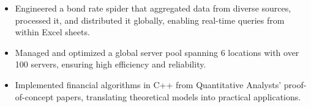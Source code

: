 \begin{minipage}{\linewidth}
\begin{itemize}
  \item Engineered a bond rate spider that aggregated data from diverse sources, processed it, and distributed it globally, enabling real-time queries from within Excel sheets.
  \item Managed and optimized a global server pool spanning 6 locations with over 100 servers, ensuring high efficiency and reliability.
  \item Implemented financial algorithms in C++ from Quantitative Analysts' proof-of-concept papers, translating theoretical models into practical applications.
\end{itemize}
\end{minipage}
\divider
